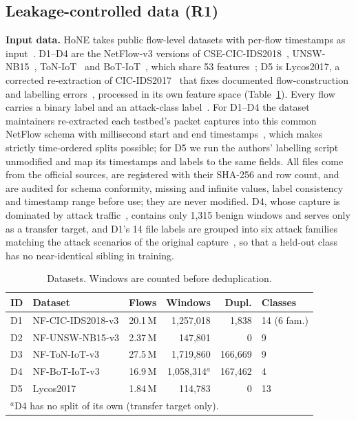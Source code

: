 \documentclass[conference]{IEEEtran}
\begin{document}
\subsection{Leakage-controlled data (R1)}
\textbf{Input data.} HoNE takes public flow-level datasets with per-flow timestamps as input~\cite{sarhan2021netflow,luay2025}. D1--D4 are the NetFlow-v3 versions of CSE-CIC-IDS2018~\cite{sharafaldin2018}, UNSW-NB15~\cite{moustafa2015}, ToN-IoT~\cite{moustafa2021} and BoT-IoT~\cite{koroniotis2019}, which share 53 features~\cite{luay2025}; D5 is Lycos2017, a corrected re-extraction of CIC-IDS2017~\cite{sharafaldin2018} that fixes documented flow-construction and labelling errors~\cite{engelen2021,rosay2021}, processed in its own feature space (Table~\ref{tab:data}). Every flow carries a binary label and an attack-class label~\cite{sarhan2021netflow,sarhan2022standard}. For D1--D4 the dataset maintainers re-extracted each testbed's packet captures into this common NetFlow schema with millisecond start and end timestamps~\cite{sarhan2021netflow}, which makes strictly time-ordered splits possible; for D5 we run the authors' labelling script unmodified and map its timestamps and labels to the same fields. All files come from the official sources, are registered with their SHA-256 and row count, and are audited for schema conformity, missing and infinite values, label consistency and timestamp range before use; they are never modified. D4, whose capture is dominated by attack traffic~\cite{koroniotis2019}, contains only 1,315 benign windows and serves only as a transfer target, and D1's 14 file labels are grouped into six attack families matching the attack scenarios of the original capture~\cite{sharafaldin2018}, so that a held-out class has no near-identical sibling in training.

\begin{table}[!t]
\centering\scriptsize\setlength{\tabcolsep}{3pt}
\caption{Datasets. Windows are counted before deduplication.}
\label{tab:data}
\begin{tabular}{llrrrl}
\toprule
ID & Dataset & Flows & Windows & Dupl. & Classes\\
\midrule
D1 & NF-CIC-IDS2018-v3 & 20.1\,M & 1,257,018 & 1,838 & 14 (6 fam.)\\
D2 & NF-UNSW-NB15-v3 & 2.37\,M & 147,801 & 0 & 9\\
D3 & NF-ToN-IoT-v3 & 27.5\,M & 1,719,860 & 166,669 & 9\\
D4 & NF-BoT-IoT-v3 & 16.9\,M & 1,058,314$^{a}$ & 167,462 & 4\\
D5 & Lycos2017 & 1.84\,M & 114,783 & 0 & 13\\
\bottomrule
\multicolumn{6}{l}{$^{a}$D4 has no split of its own (transfer target only).}
\end{tabular}
\end{table}
\end{document}
